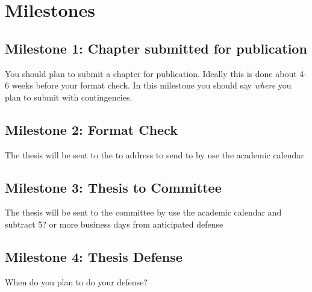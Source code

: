 \section{Milestones}
\subsection{Milestone 1: Chapter submitted for publication}
You should plan to submit a chapter for publication. Ideally this is done about 4-6 weeks before your format check. In this milestone you should say \textit{where} you plan to submit with contingencies.

\subsection{Milestone 2: Format Check}
The thesis will be sent to the to {\color{red} address to send to }  by {\color{red}  use the academic calendar }

\subsection{Milestone 3: Thesis to Committee}
The thesis will be sent to the committee by {\color{red} use the academic calendar and subtract 5? or more business days from anticipated defense }

\subsection{Milestone 4: Thesis Defense}
When do you plan to do your defense?




